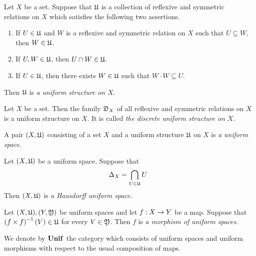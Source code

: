 \begin{definition}
Let $X$ be a set. Suppose that ${\mathfrak U}$ is a collection of reflexive and symmetric relations on $X$ which satisfies the following two assertions.
\begin{enumerate}[label=\textbf{(\arabic*)}, leftmargin=*]
\item If $U \in {\mathfrak U}$ and $W$ is a reflexive and symmetric relation on $X$ such that $U \subseteq W$, then $W\in {\mathfrak U}$.
\item If $U,W \in {\mathfrak U}$, then $U\cap W \in {\mathfrak U}$. 
\item If $U \in {\mathfrak U}$, then there exists $W \in {\mathfrak U}$ such that $W\cdot W \subseteq U$.
\end{enumerate}
Then ${\mathfrak U}$ is \textit{a uniform structure on $X$}.
\end{definition}

\begin{example}\label{example:discrete_uniform_structure}
Let $X$ be a set. Then the family ${\mathfrak D}_X$ of all reflexive and symmetric relations on $X$ is a uniform structure on $X$. It is called \textit{the discrete uniform structure on $X$}.
\end{example}

\begin{definition}
A pair $(X,{\mathfrak U})$ consisting of a set $X$ and a uniform structure ${\mathfrak U}$ on $X$ is \textit{a uniform space}.
\end{definition}

\begin{definition}
Let $(X,{\mathfrak U})$ be a uniform space. Suppose that
$$\Delta_X = \bigcap_{U\in {\mathfrak U}}U$$
Then $(X,{\mathfrak U})$ is \textit{a Hausdorff uniform space}.
\end{definition}

\begin{definition}
Let $(X,{\mathfrak U}),(Y,{\mathfrak Y})$ be uniform spaces and let $f:X\rightarrow Y$ be a map. Suppose that $\left(f\times f\right)^{-1}(V) \in {\mathfrak U}$ for every $V\in {\mathfrak Y}$. Then $f$ is \textit{a morphism of uniform spaces}. 
\end{definition}

\begin{remark}\label{remark:category_of_uniform_spaces}
We denote by $\mathbf{Unif}$ the category which consists of uniform spaces and uniform morphisms with respect to the usual composition of maps. 
\end{remark}

